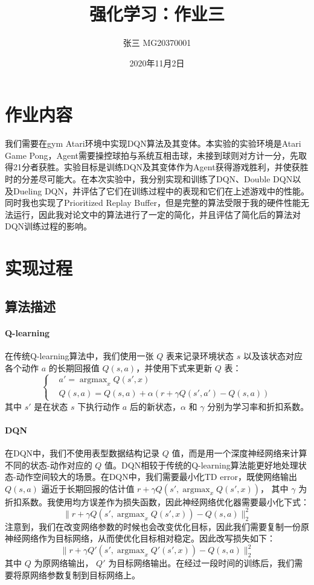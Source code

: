 \documentclass[a4paper,12pt]{article}
\begin{document}
\begin{CJK}{UTF8}{gbsn}

\title{强化学习：作业三}

\author{张三 MG20370001}

\date{2020年11月2日}

\maketitle

\section{作业内容}
我们需要在gym Atari环境中实现DQN算法及其变体。本实验的实验环境是Atari Game Pong，Agent需要操控球拍与系统互相击球，未接到球则对方计一分，先取得21分者获胜。实验目标是训练DQN及其变体作为Agent获得游戏胜利，并使获胜时的分差尽可能大。在本次实验中，我分别实现和训练了DQN、Double DQN以及Dueling DQN，并评估了它们在训练过程中的表现和它们在上述游戏中的性能。同时我也实现了Prioritized Replay Buffer，但是完整的算法受限于我的硬件性能无法运行，因此我对论文中的算法进行了一定的简化，并且评估了简化后的算法对DQN训练过程的影响。

\section{实现过程}
\subsection{算法描述}
\paragraph{Q-learning} 在传统Q-learning算法中，我们使用一张 $Q$ 表来记录环境状态 $s$ 以及该状态对应各个动作 $a$ 的长期回报值 $Q(s,a)$，并使用下式来更新 $Q$ 表：
$$
\begin{cases}
	&a'= \mathop{\arg\max}_{x} Q(s',x)\\
	&Q(s,a)=Q(s,a)+\alpha(r+\gamma Q(s',a')-Q(s,a)) 
\end{cases}
$$
其中 $s'$ 是在状态 $s$ 下执行动作 $a$ 后的新状态，$\alpha$ 和 $\gamma$ 分别为学习率和折扣系数。
\paragraph{DQN} 在DQN中，我们不使用表型数据结构记录 $Q$ 值，而是用一个深度神经网络来计算不同的状态-动作对应的 $Q$ 值。DQN相较于传统的Q-learning算法能更好地处理状态-动作空间较大的场景。在DQN中，我们需要最小化TD error，既使网络输出 $Q(s,a)$ 逼近于长期回报的估计值 $r+\gamma Q(s',\mathop{\arg\max}_{x} Q(s',x))$， 其中 $\gamma$ 为折扣系数。我使用均方误差作为损失函数，因此神经网络优化器需要最小化下式：
$$
\|r+\gamma Q(s',\mathop{\arg\max}_{x} Q(s',x))-Q(s,a)\|_2^2
$$
注意到，我们在改变网络参数的时候也会改变优化目标，因此我们需要复制一份原神经网络作为目标网络，从而使优化目标相对稳定。因此改写损失如下：
$$
\|r+\gamma Q'(s',\mathop{\arg\max}_{x} Q'(s',x))-Q(s,a)\|_2^2
$$
其中 $Q$ 为原网络输出， $Q'$ 为目标网络输出。在经过一段时间的训练后，我们需要将原网络参数复制到目标网络上。

\end{CJK}
\end{document}
